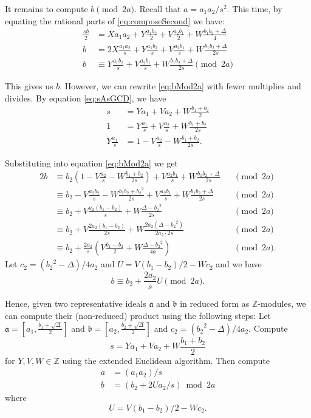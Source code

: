 \documentclass{ucalgthes1}
\theoremstyle{plain}
\theoremstyle{definition}
\newcommand{\ZZ}{\mathbb{Z}}
\begin{document}
It remains to compute $b \pmod{2a}$.  Recall that $a = a_1a_2/s^2$.  This time, by equating the rational parts of \eqref{eq:composeSecond} we have:
\begin{align}
	\frac{sb}{2} & = Xa_1a_2 + Y\frac{a_1b_2}{2} + V\frac{a_2b_1}{2} + W\frac{b_1b_2 + \Delta}{4} \nonumber \\
	b & = 2X\frac{a_1a_2}{s} + Y\frac{a_1b_2}{s} + V\frac{a_2b_1}{s} + W\frac{b_1b_2 + \Delta}{2s} \nonumber \\
	b & \equiv Y\frac{a_1b_2}{s} + V\frac{a_2b_1}{s} + W\frac{b_1b_2 + \Delta}{2s} \pmod{2a} \label{eq:bMod2a}
\end{align}

\noindent
This gives us $b$.  However, we can rewrite \eqref{eq:bMod2a} with fewer multiplies and divides.  By equation \eqref{eq:sAsGCD}, we have
\begin{align*}
	s & = Ya_1 + Va_2 + W\frac{b_1+b_2}{2} \\
	1 & = Y\frac{a_1}{s} + V\frac{a_2}{s} + W\frac{b_1+b_2}{2s} \\
	Y\frac{a_1}{s} & = 1 - V\frac{a_2}{s} - W\frac{b_1+b_2}{2s}.
\end{align*}

\noindent
Substituting into equation \eqref{eq:bMod2a} we get
\begin{alignat*}{2}
	b & \equiv b_2(1-V\frac{a_2}{s} - W\frac{b_1+b_2}{2s}) + V\frac{a_2b_1}{s} + W\frac{b_1b_2 + \Delta}{2s} && \pmod{2a} \\
	& \equiv b_2 - V\frac{a_2b_2}{s} - W\frac{b_1b_2+{b_2}^2}{2s} + V\frac{a_2b_1}{s} + W\frac{b_1b_2 + \Delta}{2s} && \pmod{2a} \\
	& \equiv b_2 + V\frac{a_2(b_1-b_2)}{s} + W\frac{\Delta - {b_2}^2}{2s} && \pmod{2a} \\
	& \equiv b_2 + V\frac{2a_2(b_1-b_2)}{2s} + W\frac{2a_2(\Delta - {b_2}^2)}{2a_2 \cdot 2s} && \pmod{2a} \\
	& \equiv b_2 + \frac{2a_2}{s} \left( V\frac{b_1-b_2}{2} + W\frac{\Delta - {b_2}^2}{4a} \right) && \pmod{2a}.
\end{alignat*}
Let $c_2 = ({b_2}^2 - \Delta)/4a_2$ and $U = V(b_1-b_2)/2 - Wc_2$ and we have
\[
	b \equiv b_2 + \frac{2a_2}{s} U \pmod{2a}.
\]

\noindent
Hence, given two representative ideals $\mathfrak a$ and $\mathfrak b$ in reduced form as $\ZZ$-modules, we can compute their (non-reduced) product using the following steps: Let $\mathfrak a = \left[a_1, \frac{b_1 + \sqrt\Delta}{2}\right]$ and $\mathfrak b = \left[a_2, \frac{b_2 + \sqrt\Delta}{2}\right]$ and $c_2 = ({b_2}^2-\Delta)/4a_2$.  Compute 
\begin{equation*}
s = Ya_1 + Va_2 + W\frac{b_1+b_2}{2}
\end{equation*}
for $Y, V, W \in \ZZ$ using the extended Euclidean algorithm. Then compute
\begin{align*} 
	a &= (a_1a_2)/s \\ 
	b &= (b_2 + 2Ua_2/s) \bmod{2a}
\end{align*}
where
\begin{equation*}
	U = V(b_1-b_2)/2 - Wc_2.
\end{equation*}
\end{document}

